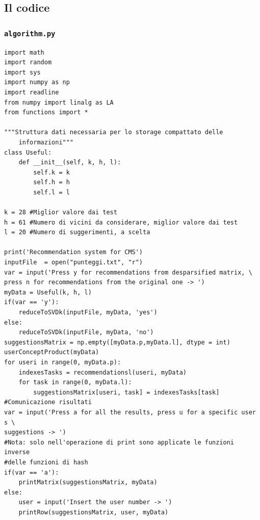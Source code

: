 \documentclass[12pt,a4paper]{article}
\theoremstyle{thm}
\theoremstyle{def}
\begin{document}
\subsection{Il codice}


\subsubsection{\tt algorithm.py}
\begin{verbatim}
import math
import random
import sys
import numpy as np
import readline
from numpy import linalg as LA
from functions import *

"""Struttura dati necessaria per lo storage compattato delle
	informazioni"""
class Useful:
	def __init__(self, k, h, l):
		self.k = k
		self.h = h
		self.l = l	

k = 28 #Miglior valore dai test
h = 61 #Numero di vicini da considerare, miglior valore dai test
l = 20 #Numero di suggerimenti, a scelta

print('Recommendation system for CMS')
inputFile  = open("punteggi.txt", "r")
var = input('Press y for recommendations from desparsified matrix, \
press n for recommendations from the original one -> ')
myData = Useful(k, h, l)
if(var == 'y'):
	reduceToSVDk(inputFile, myData, 'yes')
else:			
	reduceToSVDk(inputFile, myData, 'no')
suggestionsMatrix = np.empty([myData.p,myData.l], dtype = int)
userConceptProduct(myData)
for useri in range(0, myData.p):
	indexesTasks = recommendationsl(useri, myData)
	for task in range(0, myData.l):
		suggestionsMatrix[useri, task] = indexesTasks[task]
#Comunicazione risultati
var = input('Press a for all the results, press u for a specific user s \
suggestions -> ')
#Nota: solo nell'operazione di print sono applicate le funzioni inverse 
#delle funzioni di hash
if(var == 'a'):
	printMatrix(suggestionsMatrix, myData)
else:
	user = input('Insert the user number -> ')
	printRow(suggestionsMatrix, user, myData)

               
\end{verbatim}

\end{document}
